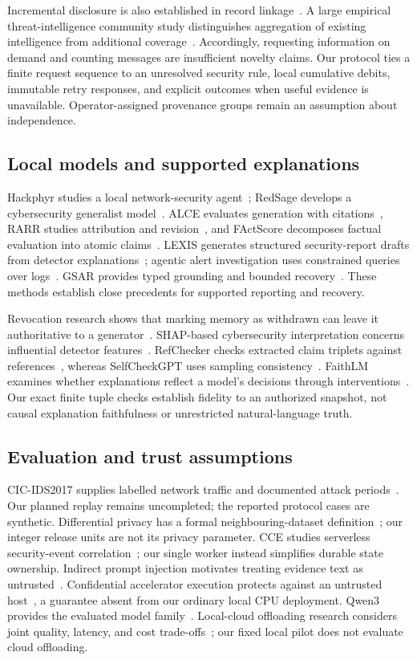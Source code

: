 \documentclass[conference,letterpaper]{IEEEtran}
\begin{document}
Incremental disclosure is also established in record linkage~\cite{kum}. A large empirical threat-intelligence community study distinguishes aggregation of existing intelligence from additional coverage~\cite{bouwman}. Accordingly, requesting information on demand and counting messages are insufficient novelty claims. Our protocol ties a finite request sequence to an unresolved security rule, local cumulative debits, immutable retry responses, and explicit outcomes when useful evidence is unavailable. Operator-assigned provenance groups remain an assumption about independence.

\subsection{Local models and supported explanations}
Hackphyr studies a local network-security agent~\cite{hackphyr}; RedSage develops a cybersecurity generalist model~\cite{redsage}. ALCE evaluates generation with citations~\cite{alce}, RARR studies attribution and revision~\cite{rarr}, and FActScore decomposes factual evaluation into atomic claims~\cite{factscore}. LEXIS generates structured security-report drafts from detector explanations~\cite{lexis}; agentic alert investigation uses constrained queries over logs~\cite{investigation}. GSAR provides typed grounding and bounded recovery~\cite{gsar}. These methods establish close precedents for supported reporting and recovery.

Revocation research shows that marking memory as withdrawn can leave it authoritative to a generator~\cite{revocation}. SHAP-based cybersecurity interpretation concerns influential detector features~\cite{securityshap}. RefChecker checks extracted claim triplets against references~\cite{refchecker}, whereas SelfCheckGPT uses sampling consistency~\cite{selfcheck}. FaithLM examines whether explanations reflect a model's decisions through interventions~\cite{faithlm}. Our exact finite tuple checks establish fidelity to an authorized snapshot, not causal explanation faithfulness or unrestricted natural-language truth.

\subsection{Evaluation and trust assumptions}
CIC-IDS2017 supplies labelled network traffic and documented attack periods~\cite{cicpaper,cicdata}. Our planned replay remains uncompleted; the reported protocol cases are synthetic. Differential privacy has a formal neighbouring-dataset definition~\cite{dwork}; our integer release units are not its privacy parameter. CCE studies serverless security-event correlation~\cite{cce}; our single worker instead simplifies durable state ownership. Indirect prompt injection motivates treating evidence text as untrusted~\cite{injection}. Confidential accelerator execution protects against an untrusted host~\cite{confidential}, a guarantee absent from our ordinary local CPU deployment. Qwen3 provides the evaluated model family~\cite{qwen3}. Local-cloud offloading research considers joint quality, latency, and cost trade-offs~\cite{offloading}; our fixed local pilot does not evaluate cloud offloading.
\end{document}
